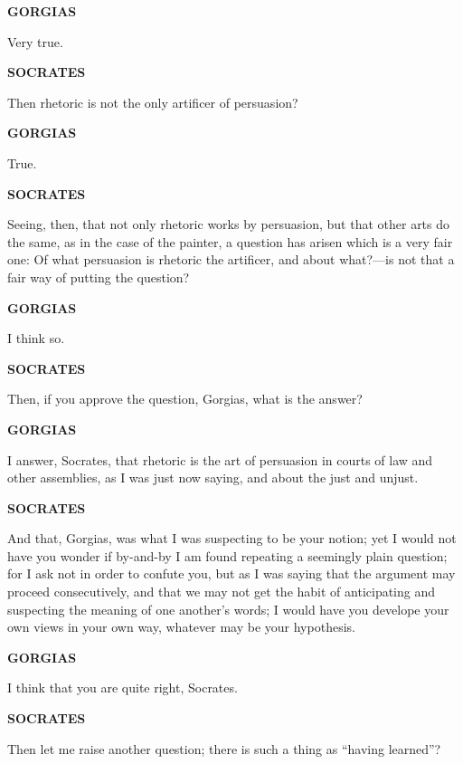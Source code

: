 \documentclass[11pt,letter]{article}
\begin{document}
\par \textbf{GORGIAS}
\par   Very true.

\par \textbf{SOCRATES}
\par   Then rhetoric is not the only artificer of persuasion?

\par \textbf{GORGIAS}
\par   True.

\par \textbf{SOCRATES}
\par   Seeing, then, that not only rhetoric works by persuasion, but that other arts do the same, as in the case of the painter, a question has arisen which is a very fair one:  Of what persuasion is rhetoric the artificer, and about what?—is not that a fair way of putting the question?

\par \textbf{GORGIAS}
\par   I think so.

\par \textbf{SOCRATES}
\par   Then, if you approve the question, Gorgias, what is the answer?

\par \textbf{GORGIAS}
\par   I answer, Socrates, that rhetoric is the art of persuasion in courts of law and other assemblies, as I was just now saying, and about the just and unjust.

\par \textbf{SOCRATES}
\par   And that, Gorgias, was what I was suspecting to be your notion; yet I would not have you wonder if by-and-by I am found repeating a seemingly plain question; for I ask not in order to confute you, but as I was saying that the argument may proceed consecutively, and that we may not get the habit of anticipating and suspecting the meaning of one another’s words; I would have you develope your own views in your own way, whatever may be your hypothesis.

\par \textbf{GORGIAS}
\par   I think that you are quite right, Socrates.

\par \textbf{SOCRATES}
\par   Then let me raise another question; there is such a thing as “having learned”?
\end{document}

